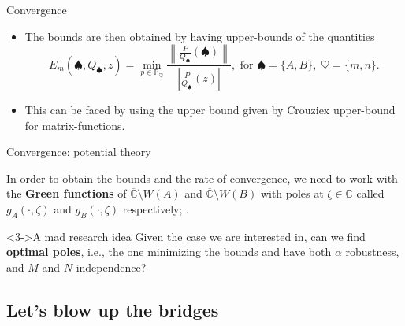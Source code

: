 \documentclass[aspectratio=169,xcolor=dvipsnames]{beamer}
\begin{document}
\begin{frame}{Convergence}
{\begin{itemize}
		\item[\faCog]<7-> The bounds are then obtained by having upper-bounds of the quantities
		\[
		E_m(\spadesuit,Q_\spadesuit,z) = \min_{p \in \mathbb{P}_\heartsuit} \frac{\left\| \frac{P}{Q_\spadesuit}(\spadesuit) \right\|}{\left\lvert \frac{P}{Q_\spadesuit}(z) \right\rvert}, \text{ for } \spadesuit = \{A,B\}, \; \heartsuit = \{m,n\}.
		\]
		\item[$\Rightarrow$]<8-> This can be faced by using the upper bound given by \alert{Crouziex upper-bound for matrix-functions}.
	\end{itemize}
	}
	\end{frame}

	\begin{frame}{Convergence: potential theory}
	
	\faHammer\; In order to obtain the bounds and the rate of convergence, we need to work with the \textbf{Green functions} of $\overline{\mathbb{C}}\setminus W(A)$ and $\overline{\mathbb{C}}\setminus W(B)$ with poles at $\zeta \in \mathbb{C}$ called $g_A(\cdot,\zeta)$ and $g_B(\cdot,\zeta)$ respectively; \parencite{MR1485778}. 
	
	
	\vfill
	\begin{exampleblock}<3->{\faBinoculars\;A mad research idea}
	Given the case we are interested in, can we find \textbf{optimal poles}, i.e., the one minimizing the bounds and have both $\alpha$ robustness, and $M$ and $N$ independence? 
	\end{exampleblock}
	
	\end{frame}

	\subsection{Let's blow up the bridges}
	
\end{document}
